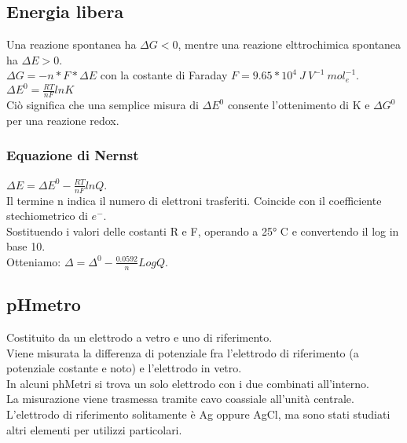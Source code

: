 \subsection{Energia libera}
Una reazione spontanea ha $\Delta G < 0$, mentre una reazione elttrochimica spontanea ha $\Delta E > 0$.\\
$\Delta G = -n * F * \Delta E$ con la costante di Faraday $F = 9.65 * 10^4\ J\ V^{-1}\ mol_e^{-1}$.\\
$\Delta E^0 = \frac{RT}{nF}lnK$\\
Ciò significa che una semplice misura di $\Delta E^0$ consente l'ottenimento di K e $\Delta G^0$ per una reazione redox.\\
\subsubsection{Equazione di Nernst}
$\Delta E = \Delta E^0 - \frac{RT}{nF}lnQ$.\\
Il termine n indica il numero di elettroni trasferiti. Coincide con il coefficiente stechiometrico di $e^-$.\\
Sostituendo i valori delle costanti R e F, operando a 25° C e convertendo il log in base 10.\\
Otteniamo: $\Delta = \Delta^0 - \frac{0.0592}{n}LogQ$.
\subsection{pHmetro}
Costituito da un elettrodo a vetro e uno di riferimento.\\
Viene misurata la differenza di potenziale fra l'elettrodo di riferimento (a potenziale costante e noto) e l'elettrodo in vetro.\\
In alcuni phMetri si trova un solo elettrodo con i due combinati all'interno.\\
La misurazione viene trasmessa tramite cavo coassiale all'unità centrale.\\
L'elettrodo di riferimento solitamente è Ag oppure AgCl, ma sono stati studiati altri elementi per utilizzi particolari.\\
